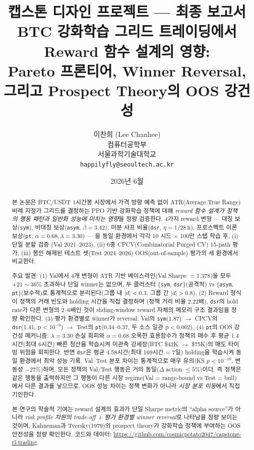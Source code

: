 \documentclass[11pt, a4paper]{article}
\title{
    \vspace{-1cm}
    {\large 캡스톤 디자인 프로젝트 — 최종 보고서}\\[0.8em]
    \textbf{BTC 강화학습 그리드 트레이딩에서\\
    Reward 함수 설계의 영향:\\
    Pareto 프론티어, Winner Reversal,\\
    그리고 Prospect Theory의 OOS 강건성}
}
\author{
    이찬희 (Lee Chanhee)\\
    컴퓨터공학부\\
    서울과학기술대학교\\
    \texttt{happilyfly@seoultech.ac.kr}
}
\date{2026년 6월}
\begin{document}
\maketitle
\thispagestyle{empty}

\begin{abstract}
본 논문은 BTC/USDT 1시간봉 시장에서 가격 방향 예측 없이 ATR(Average True Range) 비례
지정가 그리드를 결정하는 PPO 기반 강화학습 정책에 대해 \emph{reward 함수 설계가 정책의
행동 패턴과 일반화 성능에 미치는 영향}을 정량 검증한다. 4가지 reward 변형 ---
대칭 보상(\texttt{sym}), 비대칭 보상(\texttt{asym}, $\beta=3.42$),
미분 샤프 비율(\texttt{dsr}, $\eta=1/28\,\mathrm{h}$),
프로스펙트 이론 보상(\texttt{pt}, $\alpha=0.68, \lambda=3.30$) --- 을 동일 환경에서
각각 10 시드 $\times$ 100만 스텝 학습 후, (i) 단일 분할 검증 (Val 2021--2023),
(ii) 6중 CPCV(Combinatorial Purged CV) 15-path 평가,
(iii) 봉인 해제된 테스트 셋(Test 2024--2026) OOS(out-of-sample) 평가의 세 환경에서 비교한다.

주요 발견:
(1) Val에서 4개 변형이 ATR 기반 베이스라인(Val Sharpe $= 1.378$)을 모두
$+21\sim36\%$ 초과하나 단일 winner는 없으며, 두 클러스터
\{\texttt{sym}, \texttt{dsr}\}(공격적) vs \{\texttt{asym}, \texttt{pt}\}(보수적)로
통계적으로 분리된다(그룹 내 $|d|<0.3$, 그룹 간 $|d|>0.8$).
(2) Reward 형식이 정책의 거래 빈도와 holding 시간을 직접 결정하며
(정책 거리 비율 2.22배), \texttt{dsr}의 hold rate가 다른 변형의 2--6배인 것이
sliding-window reward 자체의 메모리 구조 결과임을 정량 확인한다.
(3) 평가 환경별로 winner가 reversal: Val의 \texttt{sym}(1.87) $\to$
CPCV의 \texttt{dsr}(1.41, p$<10^{-9}$) $\to$ Test의 \texttt{pt}(0.34--0.37,
두 소스 일관 p$<$0.002).
(4) \texttt{pt}의 OOS 강건성 메커니즘: $\lambda=3.30$ 손실 회피와 $\alpha=0.68$
오목한 효용함수가 정책의 매수 후 평균 1.4시간(최대 6시간) 빠른 청산을 학습시켜
미관측 강세장(BTC \$42K $\to$ \$75K)의 매도 타이밍 위험을 회피한다. 반면 \texttt{dsr}은
평균 4.58시간(최대 169시간 = 7일) holding을 학습시켜 동일 환경에서 최악 성능 기록.
Val--Test 분포 차이는 통계적으로 매우 유의(KS $p<10^{-10}$, 변동성 $-27\%$)하며,
모든 정책의 Val/Test 행동은 거의 동일($\Delta$ action $\leq 5\%$)이다. 즉 정책은
같은 행동을 출력하지만 그 행동이 다른 시장 regime(Val = range-bound vs Test = bull)에서
다른 결과를 낳으므로, OOS 성능 차이는 정책 변화가 아니라 \emph{시장 분포 이동}에서
직접 기인한다.

본 연구의 학술적 기여는 reward 설계의 효과가 단일 Sharpe metric의 ``alpha source''가
아니라 \emph{risk profile 차원의 trade-off + 평가 환경별 winner reversal}로 나타남을
정량 보이는 것이며, Kahneman과 Tversky(1979)의 prospect theory가 강화학습 정책에 부여하는
OOS 안전성을 정량 확인한다. 코드와 데이터:
\url{https://github.com/cosmicpotato2047/capstone-rl-trading}.
\end{abstract}
\end{document}
